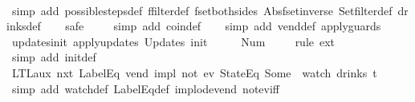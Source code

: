 \begin{isabellebody}
%
\isadelimproof
\ \ %
\endisadelimproof
%
\isatagproof
{}\isamarkupfalse%
\ {\isacharparenleft}simp\ add{\isacharcolon}\ possible{\isacharunderscore}steps{\isacharunderscore}def\ ffilter{\isacharunderscore}def\ fset{\isacharunderscore}both{\isacharunderscore}sides\ Abs{\isacharunderscore}fset{\isacharunderscore}inverse\ Set{\isachardot}filter{\isacharunderscore}def\ drinks{\isacharunderscore}def{\isacharparenright}\isanewline
\ \ \isamarkupfalse%
\ safe\isanewline
\ \ \ \isamarkupfalse%
\ {\isacharparenleft}simp\ add{\isacharcolon}\ coin{\isacharunderscore}def{\isacharparenright}\isanewline
\ \ \isamarkupfalse%
\ {\isacharparenleft}simp\ add{\isacharcolon}\ vend{\isacharunderscore}def\ apply{\isacharunderscore}guards{\isacharparenright}%
\endisatagproof
{\isafoldproof}%
%
\isadelimproof
\isanewline
%
\endisadelimproof
\isanewline
{}\isamarkupfalse%
\ updates{\isacharunderscore}init{\isacharcolon}\ {\isachardoublequoteopen}apply{\isacharunderscore}updates\ {\isacharparenleft}Updates\ init{\isacharparenright}\ {\isacharless}{\isachargreater}\ {\isacharless}{\isachargreater}\ {\isacharequal}\ {\isacharless}{}\ {\isacharcolon}{\isacharequal}\ Num\ {}{\isachargreater}{\isachardoublequoteclose}\isanewline
%
\isadelimproof
\ \ %
\endisadelimproof
%
\isatagproof
{}\isamarkupfalse%
\ {\isacharparenleft}rule\ ext{\isacharparenright}\isanewline
\ \ \isamarkupfalse%
\ {\isacharparenleft}simp\ add{\isacharcolon}\ init{\isacharunderscore}def{\isacharparenright}%
\endisatagproof
{\isafoldproof}%
%
\isadelimproof
\isanewline
%
\endisadelimproof
\isanewline
{}\isamarkupfalse%
\ LTL{\isacharunderscore}aux{}{\isacharcolon}\ {\isachardoublequoteopen}{\isacharparenleft}{\isacharparenleft}nxt\ {\isacharparenleft}LabelEq\ {\isacharprime}{\isacharprime}vend{\isacharprime}{\isacharprime}{\isacharparenright}{\isacharparenright}\ impl\ not\ {\isacharparenleft}ev\ {\isacharparenleft}StateEq\ {\isacharparenleft}Some\ {}{\isacharparenright}{\isacharparenright}{\isacharparenright}{\isacharparenright}\ {\isacharparenleft}watch\ drinks\ t{\isacharparenright}{\isachardoublequoteclose}\isanewline
%
\isadelimproof
\ \ %
\endisadelimproof
%
\isatagproof
{}\isamarkupfalse%
\ {\isacharparenleft}simp\ add{\isacharcolon}\ watch{\isacharunderscore}def\ LabelEq{\isacharunderscore}def\ implode{\isacharunderscore}vend\ not{\isacharunderscore}ev{\isacharunderscore}iff{\isacharparenright}\isanewline
\ \ \isamarkupfalse%

\end{isabellebody}
